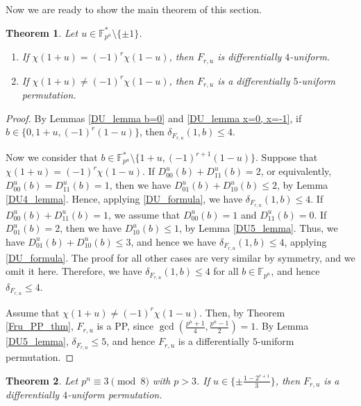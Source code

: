 \documentclass[11pt]{article}
\newtheorem{theorem}{Theorem}[section]
\numberwithin{theorem}{section}
\newcommand{\Fpn}{\mathbb{F}_{p^n}}
\newcommand{\Fpnmul}{\mathbb{F}_{p^n}^*}
\begin{document}
Now we are ready to show the main theorem of this section. 

\begin{theorem}\label{DU_thm}
	Let $u\in \Fpnmul\setminus\{\pm1\}$.
	\begin{enumerate}
		\item If $\chi(1+u)=(-1)^r\chi(1-u)$, then $F_{r,u}$ is differentially $4$-uniform.
		\item If $\chi(1+u)\ne(-1)^r\chi(1-u)$, then $F_{r,u}$ is a differentially $5$-uniform permutation. 
	\end{enumerate}
\end{theorem}

\begin{proof}
	By Lemmas \ref{DU_lemma b=0} and \ref{DU_lemma x=0, x=-1}, if $b\in \{0, 1+u,(-1)^r(1-u)\}$, then $\delta_{F_{r,u}}(1,b) \le 4$.
	
	Now we consider that $b\in \Fpnmul \setminus \{1+u, (-1)^{r+1}(1-u)\}$. Suppose that $\chi(1+u)=(-1)^r\chi(1-u)$. If $D_{00}^u(b)+D_{11}^u(b)=2$, or equivalently, $D_{00}^u(b)=D_{11}^u(b)=1$, then we have $D_{01}^u(b)+D_{10}^u(b) \le 2$, by Lemma \ref{DU4_lemma}. Hence, applying \eqref{DU_formula}, we have $\delta_{F_{r,u}}(1,b)\le 4$.
	If $D_{00}^u(b)+D_{11}^u(b)=1$, we assume that $D_{00}^u(b)=1$ and $D_{11}^u(b)=0$. If $D_{01}^u(b)=2$, then we have $D_{10}^u(b) \le 1$, by Lemma \ref{DU5_lemma}. Thus, we have $D_{01}^u(b) + D_{10}^u(b) \le 3$, and hence we have $\delta_{F_{r,u}}(1,b)\le 4$, applying \eqref{DU_formula}. The proof for all other cases are very similar by symmetry, and we omit it here. Therefore, we have $\delta_{F_{r,u}}(1,b)\le 4$ for all $b\in \Fpn$, and hence $\delta_{F_{r,u}}\le 4$.
	
	Assume that $\chi(1+u)\ne(-1)^r\chi(1-u)$. Then, by Theorem \ref{Fru_PP_thm}, $F_{r,u}$ is a PP, since $\gcd\left(\frac{p^n+1}{4}, \frac{p^n-1}{2} \right) =1$. By Lemma \ref{DU5_lemma}, $\delta_{F_{r,u}}\le 5$, and hence $F_{r,u}$ is a differentially $5$-uniform permutation.
\end{proof}


\begin{theorem}
	Let $p^n \equiv 3 \pmod{8}$ with $p > 3$. If $u \in \{\pm \frac{1-2^{r+1}}{3}\}$, then $F_{r,u}$ is a differentially $4$-uniform permutation.
\end{theorem}
\end{document}
